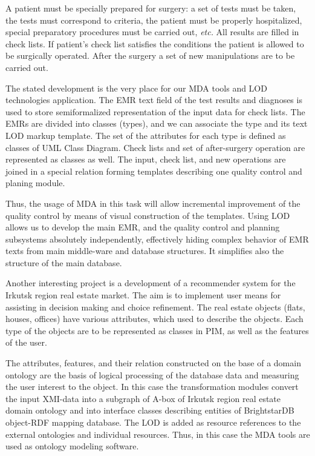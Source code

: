 \documentclass[runningheads]{llncs}
\begin{document}
A patient must be specially prepared for surgery: a set of tests must be taken, the tests must correspond to criteria, the patient must be properly hospitalized, special preparatory procedures must be carried out, \emph{etc.}  All results are filled in check lists.   If patient's check list satisfies the conditions the patient is allowed to be surgically operated.  After the surgery a set of new manipulations are to be carried out.

The stated development is the very place for our MDA tools and LOD technologies application.  The EMR text field of the test results and diagnoses is used to store semiformalized representation of the input data for check lists.  The EMRs are divided into classes (types), and we can associate the type and its text LOD markup template.  The set of the attributes for each type is defined as classes of UML Class Diagram.  Check lists and set of after-surgery operation are represented as classes as well.  The input, check list, and new operations are joined in a special relation forming templates describing one quality control and planing module.

Thus, the usage of MDA in this task will allow incremental improvement of the quality control by means of visual construction of the templates.  Using LOD allows us to develop the main EMR, and the quality control and planning subsystems absolutely independently, effectively hiding complex behavior of EMR texts from main middle-ware and database structures.  It simplifies also the structure of the main database.

Another interesting project is a development of a recommender system for the Irkutsk region real estate market.  The aim is to implement user means for assisting in decision making and choice refinement.  The real estate objects (flats, houses, offices) have various attributes, which used to describe the objects.  Each type of the objects are to be represented as classes in PIM, as well as the features of the user.

The attributes, features, and their relation constructed on the base of a domain ontology are the basis of logical processing of the database data and measuring the user interest to the object.  In this case the transformation modules convert the input XMI-data into a subgraph of A-box of Irkutsk region real estate domain ontology and into interface classes describing entities of BrightstarDB object-RDF mapping database.  The LOD is added as resource references to the external ontologies and individual resources.  Thus, in this case the MDA tools are used as ontology modeling software.
\end{document}
